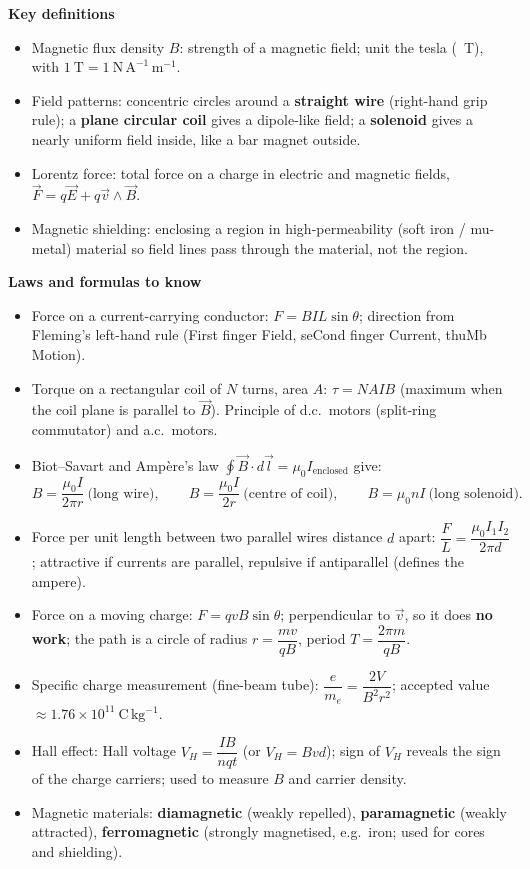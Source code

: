 \documentclass[11pt]{article}
\newcommand{\cle}[1]{{\popxbold\color{popdark}#1}}
\begin{document}
\begin{bilan}
\textbf{Key definitions}
\begin{itemize}
\item \cle{Magnetic flux density} $B$: strength of a magnetic field; unit the \cle{tesla} (\SI{}{T}), with $1\ \mathrm{T}=1\ \mathrm{N\,A^{-1}\,m^{-1}}$.
\item Field patterns: concentric circles around a \textbf{straight wire} (right-hand grip rule); a \textbf{plane circular coil} gives a dipole-like field; a \textbf{solenoid} gives a nearly uniform field inside, like a bar magnet outside.
\item \cle{Lorentz force}: total force on a charge in electric and magnetic fields, $\vec{F}=q\vec{E}+q\vec{v}\wedge\vec{B}$.
\item \cle{Magnetic shielding}: enclosing a region in high-permeability (soft iron / mu-metal) material so field lines pass through the material, not the region.
\end{itemize}

\textbf{Laws and formulas to know}
\begin{itemize}
\item Force on a current-carrying conductor: $F=BIL\sin\theta$; direction from \cle{Fleming's left-hand rule} (First finger Field, seCond finger Current, thuMb Motion).
\item Torque on a rectangular coil of $N$ turns, area $A$: $\tau=NAIB$ (maximum when the coil plane is parallel to $\vec B$). Principle of d.c.\ motors (split-ring commutator) and a.c.\ motors.
\item Biot--Savart and Amp\`ere's law $\oint\vec B\cdot d\vec l=\mu_0 I_{\text{enclosed}}$ give:
\[
B=\frac{\mu_0 I}{2\pi r}\ \text{(long wire)},\qquad
B=\frac{\mu_0 I}{2r}\ \text{(centre of coil)},\qquad
B=\mu_0 n I\ \text{(long solenoid)}.
\]
\item Force per unit length between two parallel wires distance $d$ apart: $\dfrac{F}{L}=\dfrac{\mu_0 I_1 I_2}{2\pi d}$; attractive if currents are parallel, repulsive if antiparallel (defines the ampere).
\item Force on a moving charge: $F=qvB\sin\theta$; perpendicular to $\vec v$, so it does \textbf{no work}; the path is a circle of radius $r=\dfrac{mv}{qB}$, period $T=\dfrac{2\pi m}{qB}$.
\item Specific charge measurement (fine-beam tube): $\dfrac{e}{m_e}=\dfrac{2V}{B^2 r^2}$; accepted value $\approx 1.76\times 10^{11}\ \mathrm{C\,kg^{-1}}$.
\item Hall effect: Hall voltage $V_H=\dfrac{IB}{nqt}$ (or $V_H=Bvd$); sign of $V_H$ reveals the sign of the charge carriers; used to measure $B$ and carrier density.
\item Magnetic materials: \textbf{diamagnetic} (weakly repelled), \textbf{paramagnetic} (weakly attracted), \textbf{ferromagnetic} (strongly magnetised, e.g.\ iron; used for cores and shielding).
\end{itemize}


\end{bilan}
\end{document}
